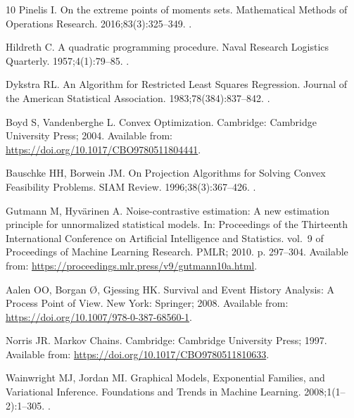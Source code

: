 \documentclass[pdflatex,sn-vancouver-num]{sn-jnl}
\theoremstyle{thmstyleone}
\begin{document}
\begin{thebibliography}{10}
Pinelis I.
\newblock On the extreme points of moments sets.
\newblock Mathematical Methods of Operations Research. 2016;83(3):325--349.
\newblock {}.

Hildreth C.
\newblock A quadratic programming procedure.
\newblock Naval Research Logistics Quarterly. 1957;4(1):79--85.
\newblock {}.

Dykstra RL.
\newblock An Algorithm for Restricted Least Squares Regression.
\newblock Journal of the American Statistical Association.
  1983;78(384):837--842.
\newblock {}.

Boyd S, Vandenberghe L.
\newblock Convex Optimization.
\newblock Cambridge: Cambridge University Press; 2004.
\newblock Available from: \url{https://doi.org/10.1017/CBO9780511804441}.

Bauschke HH, Borwein JM.
\newblock On Projection Algorithms for Solving Convex Feasibility Problems.
\newblock SIAM Review. 1996;38(3):367--426.
\newblock {}.

Gutmann M, Hyv{\"a}rinen A.
\newblock Noise-contrastive estimation: A new estimation principle for
  unnormalized statistical models.
\newblock In: Proceedings of the Thirteenth International Conference on
  Artificial Intelligence and Statistics. vol.~9 of Proceedings of Machine
  Learning Research. PMLR; 2010. p. 297--304.
\newblock Available from:
  \url{https://proceedings.mlr.press/v9/gutmann10a.html}.

Aalen OO, Borgan {\O}, Gjessing HK.
\newblock Survival and Event History Analysis: A Process Point of View.
\newblock New York: Springer; 2008.
\newblock Available from: \url{https://doi.org/10.1007/978-0-387-68560-1}.

Norris JR.
\newblock Markov Chains.
\newblock Cambridge: Cambridge University Press; 1997.
\newblock Available from: \url{https://doi.org/10.1017/CBO9780511810633}.

Wainwright MJ, Jordan MI.
\newblock Graphical Models, Exponential Families, and Variational Inference.
\newblock Foundations and Trends in Machine Learning. 2008;1(1--2):1--305.
\newblock {}.


\end{thebibliography}
\end{document}
